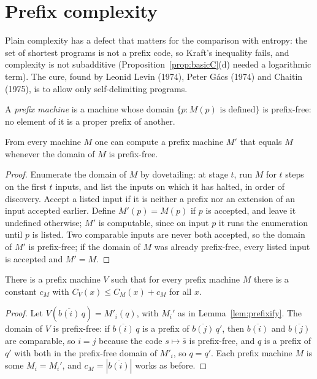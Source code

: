 \section{Prefix complexity}\label{sec:prefix}

Plain complexity has a defect that matters for the comparison with entropy: the set of shortest programs is not a prefix code, so Kraft's inequality fails, and complexity is not subadditive (Proposition~\ref{prop:basicC}(d) needed a logarithmic term). The cure, found by Leonid Levin (1974), Peter Gács (1974) and Chaitin (1975), is to allow only self-delimiting programs.

\begin{definition}\label{def:prefixmachine}
A \emph{prefix machine} is a machine whose domain $\{p:M(p)\text{ is defined}\}$ is prefix-free: no element of it is a proper prefix of another.
\end{definition}

\begin{lemma}\label{lem:prefixify}
From every machine $M$ one can compute a prefix machine $M'$ that equals $M$ whenever the domain of $M$ is prefix-free.
\end{lemma}

\begin{proof}
Enumerate the domain of $M$ by dovetailing: at stage $t$, run $M$ for $t$ steps on the first $t$ inputs, and list the inputs on which it has halted, in order of discovery. Accept a listed input if it is neither a prefix nor an extension of an input accepted earlier. Define $M'(p)=M(p)$ if $p$ is accepted, and leave it undefined otherwise; $M'$ is computable, since on input $p$ it runs the enumeration until $p$ is listed. Two comparable inputs are never both accepted, so the domain of $M'$ is prefix-free; if the domain of $M$ was already prefix-free, every listed input is accepted and $M'=M$.
\end{proof}

\begin{theorem}\label{thm:prefixinvariance}
There is a prefix machine $V$ such that for every prefix machine $M$ there is a constant $c_M$ with $C_V(x)\le C_M(x)+c_M$ for all $x$.
\end{theorem}

\begin{proof}
Let $V(\overline{b(i)}\,q)=M'_i(q)$, with $M_i'$ as in Lemma~\ref{lem:prefixify}. The domain of $V$ is prefix-free: if $\overline{b(i)}\,q$ is a prefix of $\overline{b(j)}\,q'$, then $\overline{b(i)}$ and $\overline{b(j)}$ are comparable, so $i=j$ because the code $s\mapsto\bar s$ is prefix-free, and $q$ is a prefix of $q'$ with both in the prefix-free domain of $M'_i$, so $q=q'$. Each prefix machine $M$ is some $M_i=M_i'$, and $c_M=|\overline{b(i)}|$ works as before.
\end{proof}

